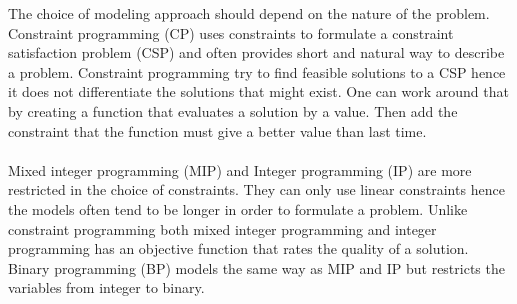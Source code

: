 The choice of modeling approach should depend on the nature of the problem. Constraint programming (CP) uses 
constraints to formulate a constraint satisfaction problem (CSP) and often provides short and natural way to 
describe a problem. Constraint programming try to find feasible solutions to a CSP hence it does not 
differentiate the solutions that might exist. One can work around that by creating a function that evaluates a 
solution by a value. Then add the constraint that the function must give a better value than last time. \\ 
 \\ 
Mixed integer programming (MIP) and Integer programming (IP) are more restricted in the choice of constraints. They can 
only use linear constraints hence the models often tend to be longer in order to formulate a problem. Unlike 
constraint programming both mixed integer programming and integer programming has an objective function that rates the 
quality of a solution. Binary programming (BP) models the same way as MIP and IP but restricts the variables from 
integer to binary. \\



